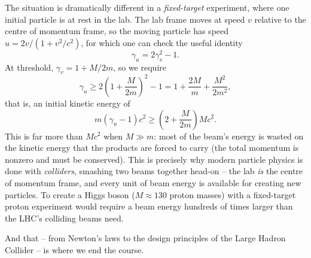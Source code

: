The situation is dramatically different in a \emph{fixed-target} experiment, where one initial particle is at rest in the lab. The lab frame moves at speed $v$ relative to the centre of momentum frame, so the moving particle has speed $u = 2v/(1 + v^2/c^2)$, for which one can check the useful identity
$$
\gamma_u = 2\gamma_v^2 - 1.
$$
At threshold, $\gamma_v = 1 + M/2m$, so we require
$$
\gamma_u \geq 2\left(1 + \frac{M}{2m}\right)^2 - 1 = 1 + \frac{2M}{m} + \frac{M^2}{2m^2},
$$
that is, an initial kinetic energy of
$$
m(\gamma_u - 1)c^2 \geq \left(2 + \frac{M}{2m}\right)Mc^2.
$$
This is far more than $Mc^2$ when $M \gg m$: most of the beam's energy is wasted on the kinetic energy that the products are forced to carry (the total momentum is nonzero and must be conserved). This is precisely why modern particle physics is done with \emph{colliders}, smashing two beams together head-on -- the lab \emph{is} the centre of momentum frame, and every unit of beam energy is available for creating new particles. To create a Higgs boson ($M \approx 130$ proton masses) with a fixed-target proton experiment would require a beam energy hundreds of times larger than the LHC's colliding beams need.

And that -- from Newton's laws to the design principles of the Large Hadron Collider -- is where we end the course.

